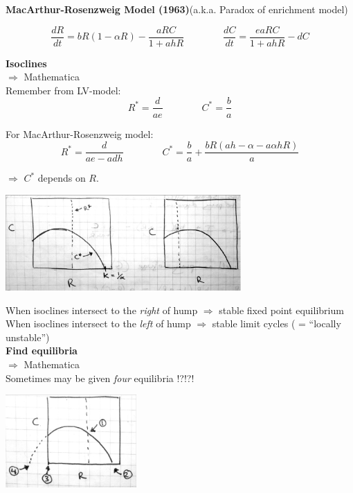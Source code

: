 \documentclass{article}
\newcommand{\note}[1]{\colorbox{gray!30}{#1}}
\newcommand{\ind}{\-\hspace{1cm}}
\begin{document}
\textbf{MacArthur-Rosenzweig Model (1963)}(a.k.a. Paradox of enrichment model)

\begin{equation*}
	\frac{dR}{dt}=bR(1-\alpha R) - \frac{aRC}{1+ahR} \qquad \qquad  \frac{dC}{dt}=\frac{eaRC}{1+ahR}-dC 
\end{equation*}

\textbf{Isoclines}\\
\ind \note{$\Rightarrow$ Mathematica}\\

Remember from LV-model:
\begin{equation*}
	R^*=\frac{d}{ae} \qquad \qquad C^* = \frac{b}{a}
\end{equation*}

For MacArthur-Rosenzweig model:
\begin{equation*}
	R^*=\frac{d}{ae-adh} \qquad \qquad C^* = \frac{b}{a} + \frac{bR(ah-\alpha-a \alpha h R)}{a}
\end{equation*}
\begin{center} $\Rightarrow$ $C^*$ depends on $R$.\end{center}

\begin{center}
\includegraphics[width=9cm]{figs/MRiso.pdf}
\end{center}

When isoclines intersect to the \emph{right} of hump $\Rightarrow$ stable fixed point equilibrium\\
When isoclines intersect to the \emph{left} of hump $\Rightarrow$ stable limit cycles ( = ``locally unstable'')\\

\textbf{Find equilibria}\\
\ind \note{$\Rightarrow$ Mathematica}\\
Sometimes may be given \emph{four} equilibria !?!?!
\begin{center}
\includegraphics[width=5cm]{figs/MRiso2.pdf}
\end{center}
\end{document}
